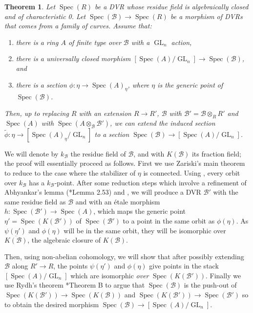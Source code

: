 \documentclass{amsart}
\newcommand{\cB}{\mathcal{B}}
\newcommand{\qB}{R}
\newcommand{\qR}{\cB}
\newcommand{\spec}{\operatorname{Spec}}
\newcommand{\GL}{\operatorname{GL}}
\newtheorem{Teo}[theorem]{Theorem}
\theoremstyle{definition}
\begin{document}
\begin{Teo}\label{teorema fix}
Let $\spec(\qB)$ be a DVR whose residue field is algebraically closed and of characteristic 0. Let $\spec(\qR)\to \spec(\qB)$ be a morphism of DVRs that comes from a family of curves. 
Assume that:
\begin{enumerate}
    \item[$\operatorname{(i)}$] there is a ring $A$ of finite type over $\qR$ with a $\GL_n$ action,
    \item[$\operatorname{(ii)}$]  there is a universally closed morphism $[\spec(A)/\GL_n]\to \spec(\qR)$, and
    \item[$\operatorname{(iii)}$] there is a section $\phi:\eta\to \spec(A)_\eta$, where $\eta$ is the generic point of $\spec(\qR)$.
\end{enumerate}
Then, up to replacing $\qB$ with an extension $\qB\to \qB'$, $\qR$ with $\qR'=\qR\otimes_\qB \qB'$ and $\spec(A)$ with $\spec(A\otimes_\qR \qR')$, we can extend the induced section $\widetilde{\phi}:\eta\to [\spec(A)_\eta/\GL_n]$ to a section $\spec(\qR)\to [\spec(A)/\GL_n]$.
\end{Teo}
 We will denote by $k_\qR$ the residue field of $\qR$, and with $K(\qR)$ its fraction field; the proof will essentially proceed as follows. First we use Zariski's main theorem to reduce to the case where the stabilizer of $\eta$ is connected. Using , every orbit over $k_\qR$ has a $k_\qR$-point.
 After some reduction steps which involve a refinement of Abhyankar's lemma (\cite{kollar_modbook}*{Lemma 2.53}) and , we will produce a DVR $\qR'$ with the same residue field as $\qR$ and with an \'etale morphism $h:\spec(\qR')\to \spec(A)$, which maps the generic point $\eta'=\spec(K(\qR'))$ of $\spec(\qR')$ to a point in the same orbit as $\phi(\eta)$. As $\psi(\eta')$ and $\phi(\eta)$ will be in the same orbit, they will be isomorphic over $\overline{K(\qR)}$, the algebraic closure of $K(\qR)$.
 
Then, using non-abelian cohomology, we will show that after possibly extending $\qR$ along $\qB'\to \qB$, the points $\psi(\eta')$ and $\phi(\eta)$ give points in the stack $[\spec(A)/\GL_n]$ which are isomorphic \textit{over} $\spec(K(\qR'))$. Finally we use Rydh's theorem \cite{rydh2011etale}*{Theorem B} to argue that $\spec(\qR)$ is the push-out of $\spec(K(\qR'))\to \spec(K(\qR))$ and $\spec(K(\qR'))\to \spec(\qR')$ so to obtain the desired morphism $\spec(\qR)\to [\spec(A)/\GL_n]$.
\end{document}
